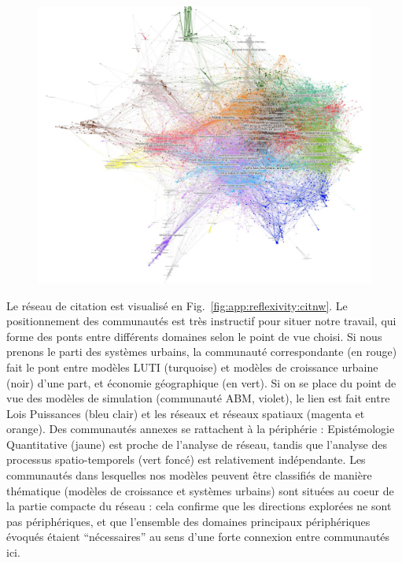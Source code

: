 \begin{figure}
	\includegraphics[width=\linewidth]{Figures/Final/F-reflexivity-citnw.jpg}
\end{figure}

Le réseau de citation est visualisé en Fig.~\ref{fig:app:reflexivity:citnw}. Le positionnement des communautés est très instructif pour situer notre travail, qui forme des ponts entre différents domaines selon le point de vue choisi. Si nous prenons le parti des systèmes urbains, la communauté correspondante (en rouge) fait le pont entre modèles LUTI (turquoise) et modèles de croissance urbaine (noir) d'une part, et économie géographique (en vert). Si on se place du point de vue des modèles de simulation (communauté ABM, violet), le lien est fait entre Lois Puissances (bleu clair) et les réseaux et réseaux spatiaux (magenta et orange). Des communautés annexes se rattachent à la périphérie : Epistémologie Quantitative (jaune) est proche de l'analyse de réseau, tandis que l'analyse des processus spatio-temporels (vert foncé) est relativement indépendante. Les communautés dans lesquelles nos modèles peuvent être classifiés de manière thématique (modèles de croissance et systèmes urbains) sont situées au coeur de la partie compacte du réseau : cela confirme que les directions explorées ne sont pas périphériques, et que l'ensemble des domaines principaux périphériques évoqués étaient ``nécessaires'' au sens d'une forte connexion entre communautés ici.



